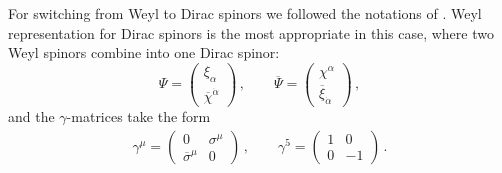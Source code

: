 \documentclass[12pt]{revtex4}
\begin{document}
For switching from Weyl to Dirac spinors we followed the notations of 
\cite{Martin:1997ns}.
Weyl representation for Dirac spinors is the most appropriate in this case,
where two Weyl spinors combine into one Dirac spinor:
\[
\Psi = 
\left (
\begin{array}{c}
  \xi_\alpha \\
\overline{\chi}^{\dot\alpha}
\end{array}
\right )\,,
\qquad
\overline{\Psi} = 
\left (
\begin{array}{c}
  \chi^\alpha \\
\overline{\xi}_{\dot\alpha}
\end{array}
\right )\,,
\]
and the $ \gamma $-matrices take the form
\begin{eqnarray*}
\gamma^\mu = 
\left ( 
\begin{array}{cc}
0                    &    \sigma^\mu \\
                     \overline{\sigma}^\mu   &         0    
\end{array}
\right )\,,
\qquad
\gamma^5 = 
\left ( 
\begin{array}{cc}
1      &         0  \\
                        0      &        -1    
\end{array}
\right )\,.
\end{eqnarray*}
\end{document}

